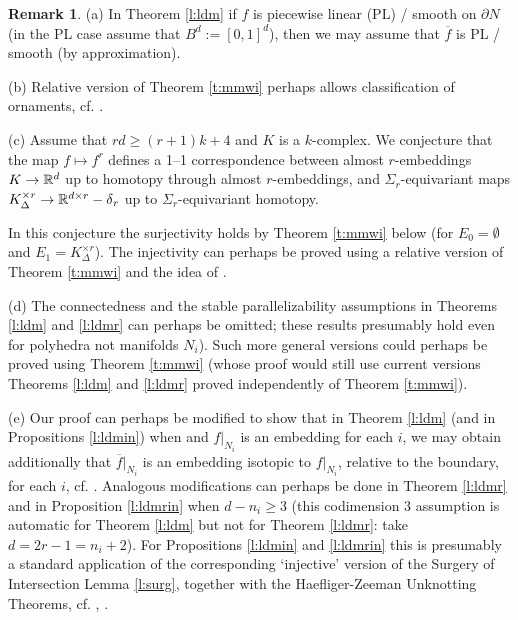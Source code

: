 \documentclass[12pt]{article}
\newcommand{\aronly}[1]{#1}
\def\diag{\delta}
\theoremstyle{plain}
\theoremstyle{definition}
\newtheorem{Remark}[Theorem]{Remark}
\begin{document}
\aronly{

\begin{Remark}\label{r:conj}
(a) In Theorem \ref{l:ldm} if $f$ is piecewise linear (PL) / smooth on $\partial N$ (in the PL case assume that $B^d:=[0,1]^d$), then we may assume that $\overline f$ is PL / smooth (by approximation).

(b) Relative version of Theorem \ref{t:mmwi} perhaps allows
classification of ornaments, cf. \cite[\S1.3]{AMSW}.

(c) Assume that $rd\ge(r+1)k+4$ and $K$ is a $k$-complex.
We conjecture that the map $f\mapsto f^r$ defines a 1--1 correspondence between almost $r$-embeddings $K\to{\mathbb R}^d$ up to homotopy through almost $r$-embeddings, and $\Sigma_r$-equivariant maps
$K^{\times r}_{\Delta}\to \R^{d\times r}-\diag\phantom{}_r$ up to $\Sigma_r$-equivariant homotopy.

In this conjecture the surjectivity holds by Theorem \ref{t:mmwi} below (for $E_0=\emptyset$
and $E_1=K^{\times r}_{\Delta}$).
The injectivity can perhaps be proved using a relative version of Theorem \ref{t:mmwi} and the idea of \cite[\S5]{Sk02}.

(d) The connectedness and the stable parallelizability assumptions in Theorems \ref{l:ldm} and \ref{l:ldmr} can perhaps be omitted; these results presumably hold even for polyhedra not manifolds $N_i$).
Such more general versions could perhaps be proved using Theorem \ref{t:mmwi} (whose proof would still use current versions Theorems \ref{l:ldm} and \ref{l:ldmr} proved independently of Theorem \ref{t:mmwi}).

(e) Our proof can perhaps be modified to show that in Theorem \ref{l:ldm} (and in Propositions \ref{l:ldmin}) when and $f|_{N_i}$ is an embedding for each $i$, we may obtain additionally that $\overline f|_{N_i}$ is an embedding isotopic to $f|_{N_i}$, relative to the boundary, for each $i$, cf. \cite[Lemma~10]{MW15}.
Analogous modifications can perhaps be done in Theorem \ref{l:ldmr} and in Proposition \ref{l:ldmrin} when
$d-n_i\ge3$ (this codimension 3 assumption is automatic for Theorem \ref{l:ldm} but not for Theorem \ref{l:ldmr}: take $d=2r-1=n_i+2$).
For Propositions \ref{l:ldmin} and \ref{l:ldmrin} this is presumably a standard application of the corresponding `injective' version of the Surgery of Intersection Lemma \ref{l:surg}, together with the Haefliger-Zeeman Unknotting Theorems, cf. \cite[\S4, proof of Proposition 2 presented before Proposition 2]{We67},
\cite[proofs of Propositions 8.4 and 8.5, a generalization of the Whitney trick]{Sk06}.
\end{Remark}

}
\end{document}
